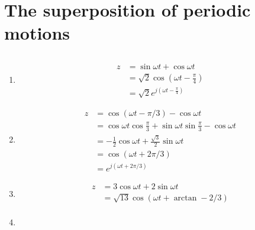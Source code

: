 \documentclass{article}
\begin{document}
\section{The superposition of periodic motions}

\subsection{}

\begin{enumerate}
  \item

        \begin{align*}
          z & = \sin \omega t + \cos \omega t                          \\
            & = \sqrt{2} \cos \left( \omega t - \frac{\pi}{4} \right)  \\
            & = \sqrt{2} e^{j \left( \omega t - \frac{\pi}{4} \right)}
        \end{align*}

  \item

        \begin{align*}
          z & = \cos (\omega t - \pi / 3) - \cos \omega t                                           \\
            & = \cos \omega t \cos \frac{\pi}{3} + \sin \omega t \sin \frac{\pi}{3} - \cos \omega t \\
            & = -\frac{1}{2} \cos \omega t + \frac{\sqrt{3}}{2} \sin \omega t                       \\
            & = \cos (\omega t + 2 \pi / 3)                                                         \\
            & = e^{j (\omega t + 2 \pi / 3)}
        \end{align*}

  \item

        \begin{align*}
          z & = 3 \cos \omega t + 2 \sin \omega t          \\
            & = \sqrt{13} \cos (\omega t + \arctan -2 / 3) \\
        \end{align*}

  \item


\end{enumerate}
\end{document}
